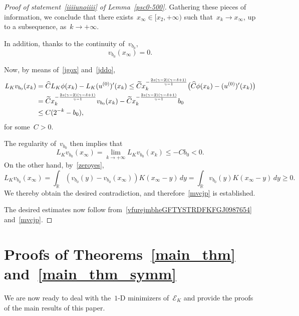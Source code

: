 \documentclass[10pt,a4paper]{amsart}
\numberwithin{equation}{section}
\newcommand{\R}{\mathbb{R}}
\newcommand{\Ec}{\mathcal{E}_K}
\begin{document}
\begin{proof}[Proof of statement~\eqref{iiiiunoiiii} of Lemma~\ref{psc0-500}]
Gathering these pieces of information, we conclude that
there exists~$x_{\infty} \in [ x_2, +\infty)$ such that~$x_k \to x_{\infty}$, up to a subsequence, as~$k\to+\infty$. 

In addition, thanks to the continuity of~$v_{b_0}$,
\begin{equation}\label{zeroyes}
v_{b_0}(x_{\infty})=0.
\end{equation}

Now, by means of~\eqref{jgox} and~\eqref{jddo},
\begin{equation*}
\begin{split}
{L}_K v_{b_0}(x_k) &= \widehat{C}{L}_K \phi(x_k) -  {L}_K (u^{(0)})\rq{} (x_k) \leq  \widetilde{C} x_k^{-\frac{2s(\gamma -2)(\gamma-\delta+1)}{\gamma-1}} \big(\widehat{C}\phi(x_k) - (u^{(0)})\rq{}(x_k) \big) \\
&= \widetilde{C} x_k^{-\frac{2s(\gamma -2)(\gamma-\delta+1)}{\gamma-1}}v_{b_0}(x_k) -  \widetilde{C}  x_k^{-\frac{2s(\gamma -2)(\gamma-\delta+1)}{\gamma-1}} b_0 \\
&\leq C( 2^{-k}- b_0),
\end{split}
\end{equation*}
for some~$C>0$. 

The regularity of~$v_{b_0}$ then implies that
\begin{equation*}
{L}_K v_{b_0}(x_{\infty}) = \lim_{k \to +\infty} {L}_K v_{b_0}(x_k) \leq -C b_0 <0.
\end{equation*}
On the other hand, by~\eqref{zeroyes},
\begin{equation*}
{L}_K v_{b_0}(x_{\infty}) = \int_{\R} (v_{b_0}(y)-v_{b_0}(x_{\infty})) K(x_{\infty}-y) \, dy 
= \int_{\R} v_{b_0}(y) K(x_{\infty}-y) \, dy \geq 0.
\end{equation*}
We thereby obtain the desired contradiction,
and therefore~\eqref{mvcjp} is established.

The desired estimates now follow from~\eqref{vfurejmbheGFTYSTRDFKFGJ0987654}
and~\eqref{mvcjp}.
\end{proof}

\section{Proofs of Theorems~\ref{main_thm} and~\ref{main_thm_symm}}\label{main_thm_proof}

We are now ready to deal with the~$1$-D minimizers of~$\Ec$ and provide the proofs of the main results of this paper.
\end{document}
